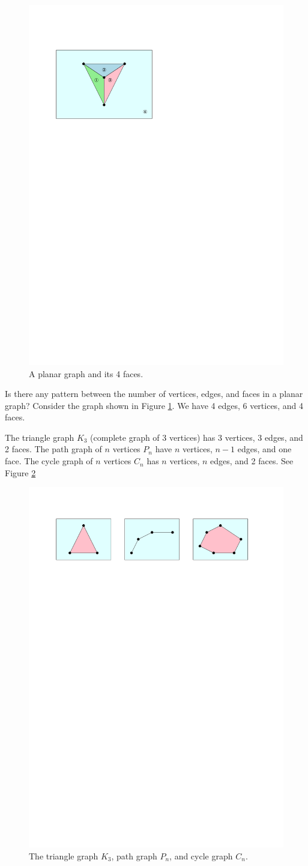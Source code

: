 \begin{figure}[htbp]
    \centering
    \includegraphics[width=0.4\linewidth]{figures/planar-graph-faces.pdf}
    \caption{A planar graph and its 4 faces.}
    \label{fig:planar-graph-faces}
\end{figure}

Is there any pattern between the number of vertices, edges, and faces in a planar graph? Consider the graph shown in Figure \ref{fig:planar-graph-faces}. We have 4 edges, 6 vertices, and 4 faces.

The triangle graph $K_3$ (complete graph of 3 vertices) has 3 vertices, 3 edges, and 2 faces. The path graph of $n$ vertices $P_n$ have $n$ vertices, $n-1$ edges, and one face. The cycle graph of $n$ vertices $C_n$ has $n$ vertices, $n$ edges, and 2 faces. See Figure \ref{fig:euler-formula-example-graphs}

\begin{figure}[htbp]
    \centering
    \includegraphics[width=0.6\linewidth]{figures/euler-formula-example-graphs.pdf}
    \caption{The triangle graph $K_3$, path graph $P_n$, and cycle graph $C_n$.}
    \label{fig:euler-formula-example-graphs}
\end{figure}

